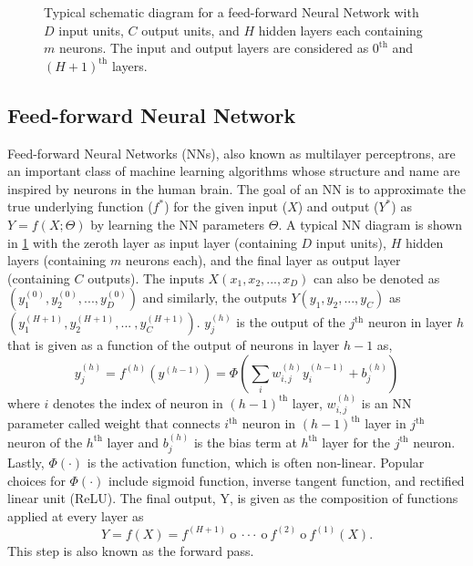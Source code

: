 \begin{figure}[t]
	\caption{Typical schematic diagram for a feed-forward Neural Network with $D$ input units, $C$ output units, and $H$ hidden layers each containing $m$ neurons.
	The input and output layers are considered as $0^\text{th}$ and $(H+1)^\text{th}$ layers. 
	}
	\label{c7:NN}
\end{figure}
\subsection{Feed-forward Neural Network}\label{c7:s1sb3}
Feed-forward Neural Networks (NNs), also known as multilayer perceptrons, are an important class of machine learning algorithms whose structure and name are inspired by neurons in the human brain. 
The goal of an NN is to approximate the true underlying function ($f^*$) for the given input ($X$) and output ($Y^*$) as $Y = f(X; \Theta)$ by learning the NN parameters $\Theta$. 
A typical NN diagram is shown in \cref{c7:NN}
with the zeroth layer as input layer (containing $D$ input units), $H$ hidden layers (containing $m$ neurons each), and the final layer as output layer (containing $C$ outputs). 
The inputs $X(x_1, x_2, ...  , x_D)$ can also be denoted as $(y_1^{(0)}, y_2^{(0)}, ...  , y_D^{(0)})$ and similarly, the outputs $Y(y_1, y_2, ... , y_C)$ as $(y_1^{(H+1)}, y_2^{(H+1)}, ... \ , y_C^{(H+1)})$.
$y_j^{(h)}$ is the output of the $j^\text{th}$ neuron in layer $h$ that is given as a function of the output of neurons in layer $h-1$ as,
\begin{equation}
y_j^{(h)} = f^{(h)}(y^{(h-1)}) = \Phi\left( \sum_{i}w_{i,j}^{(h)}y_i^{(h-1)} + b_j^{(h)}    \right) 
\label{c7:eq_neuron}
\end{equation}
where $i$ denotes the index of neuron in $(h-1)^\text{th}$ layer, $w_{i,j}^{(h)}$ is an NN parameter called weight that connects $i^\text{th}$ neuron in $(h-1)^\text{th}$ layer in $j^\text{th}$ neuron of the $h^\text{th}$ layer 
and $b_j^{(h)}$ is the bias term at $h^\text{th}$ layer for the $j^\text{th}$ neuron. 
Lastly, $\Phi(\cdot)$ is the activation function, which is often non-linear.  
Popular choices for  $\Phi(\cdot)$ include sigmoid function, inverse tangent function, and rectified linear unit (ReLU).
The final output, Y, is given as the composition of functions applied at every layer as
\begin{equation}
Y = f(X) = f^{(H+1)} \ \text{o} \ \cdot \cdot \cdot \ \text{o} \ f^{(2)} \ \text{o} \ f^{(1)}(X).
\label{c7:eq_out_NN}
\end{equation}
This step is also known as the forward pass. 

